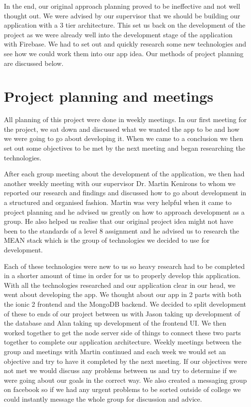 In the end, our original approach planning proved to be ineffective and not well thought out. We were advised by our supervisor that we should be building our application with a 3 tier architecture. This set us back on the development of the project as we were already well into the development stage of the application with Firebase. We had to set out and quickly research some new technologies and see how we could work them into our app idea. Our methods of project planning are discussed below.
\section{Project planning and meetings}
All planning of this project were done in weekly meetings. In our first meeting for the project, we sat down and discussed what we wanted the app to be and how we were going to go about developing it. When we came to a conclusion we then set out some objectives to be met by the next meeting and began researching the technologies.

After each group meeting about the development of the application, we then had another weekly meeting with our supervisor Dr. Martin Kenirons to whom we reported our research and findings and discussed how to go about development in a structured and organised fashion. Martin was very helpful when it came to project planning and he advised us greatly on how to approach development as a group. He also helped us realise that our original project idea might not have been to the standards of a level 8 assignment and he advised us to research the MEAN stack which is the group of technologies we decided to use for development.

Each of these technologies were new to us so heavy research had to be completed in a shorter amount of time in order for us to properly develop this application. With all the technologies researched and our application clear in our head, we went about developing the app. We thought about our app in 2 parts with both the ionic 2 frontend and the MongoDB backend. We decided to split development of these to ends of our project between us with Jason taking up development of the database and Alan taking up development of the frontend UI. We then worked together to get the node server side of things to connect these two parts together to complete our application architecture. Weekly meetings between the group and meetings with Martin continued and each week we would set an objective and try to have it completed by the next meeting. If our objectives were not met we would discuss any problems between us and try to determine if we were going about our goals in the correct way. We also created a messaging group on facebook so if we had any urgent problems to be sorted outside of college we could instantly message the whole group for discussion and advice.

